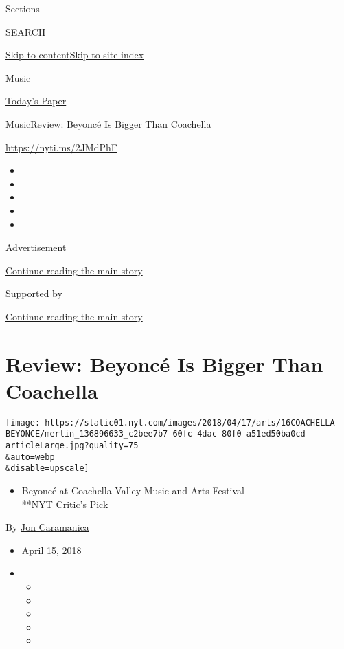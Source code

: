 Sections

SEARCH

\protect\hyperlink{site-content}{Skip to
content}\protect\hyperlink{site-index}{Skip to site index}

\href{https://www.nytimes.com/section/arts/music}{Music}

\href{https://myaccount.nytimes.com/auth/login?response_type=cookie\&client_id=vi}{}

\href{https://www.nytimes.com/section/todayspaper}{Today's Paper}

\href{/section/arts/music}{Music}\textbar{}Review: Beyoncé Is Bigger
Than Coachella

\url{https://nyti.ms/2JMdPhF}

\begin{itemize}
\item
\item
\item
\item
\item
\end{itemize}

Advertisement

\protect\hyperlink{after-top}{Continue reading the main story}

Supported by

\protect\hyperlink{after-sponsor}{Continue reading the main story}

\hypertarget{review-beyoncuxe9-is-bigger-than-coachella}{%
\section{Review: Beyoncé Is Bigger Than
Coachella}\label{review-beyoncuxe9-is-bigger-than-coachella}}

\texttt{[image: https://static01.nyt.com/images/2018/04/17/arts/16COACHELLA-BEYONCE/merlin\_136896633\_c2bee7b7-60fc-4dac-80f0-a51ed50ba0cd-articleLarge.jpg?quality=75\\\&auto=webp\\\&disable=upscale]}

\begin{itemize}
\tightlist
\item
  Beyoncé at Coachella Valley Music and Arts Festival\\
  **NYT Critic's Pick
\end{itemize}

By \href{http://www.nytimes.com/by/jon-caramanica}{Jon Caramanica}

\begin{itemize}
\item
  April 15, 2018
\item
  \begin{itemize}
  \item
  \item
  \item
  \item
  \item
  \end{itemize}
\end{itemize}

